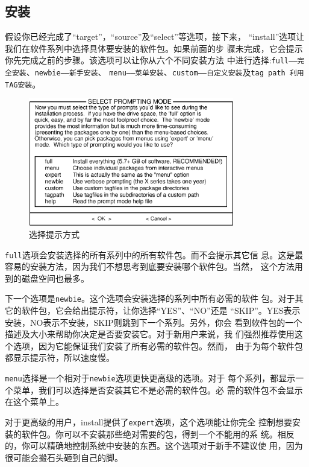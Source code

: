 \subsection{安装}
\label{sec:installation:setup:install}

假设你已经完成了``target''，``source''及``select''等选项，接下来，
``install''选项让我们在软件系列中选择具体要安装的软件包。如果前面的步
骤未完成，它会提示你先完成之前的步骤。该选项可以让你从六个不同安装方法
中进行选择:\texttt{full——完全安装}、\texttt{newbie——新手安装}、
\texttt{menu——菜单安装}、\texttt{custom——自定义安装}及\texttt{tag path
  利用TAG安装}。
\begin{figure}[htpb]
  \centering
  \includegraphics[width=0.8\textwidth]{images/installation/setup-install.eps}
  \caption{选择提示方式}
  \label{fig:selectPromptingMode}
\end{figure}

\texttt{full}选项会安装选择的所有系列中的所有软件包。而不会提示其它信
息。这是最容易的安装方法，因为我们不想思考到底要安装哪个软件包。当然，
这个方法用到的磁盘空间也最多。

下一个选项是\texttt{newbie}。这个选项会安装选择的系列中所有必需的软件
包。对于其它的软件包，它会给出提示符，让你选择``YES''、``NO''还是
``SKIP''。YES表示安装，NO表示不安装，SKIP则跳到下一个系列。另外，你会
看到软件包的一个描述及大小来帮助你决定是否要安装它。对于新用户来说，我
们强烈推荐使用这个选项，因为它能保证我们安装了所有必需的软件包。然而，
由于为每个软件包都显示提示符，所以速度慢。

\texttt{menu}选择是一个相对于\texttt{newbie}选项更快更高级的选项。对于
每个系列，都显示一个菜单，我们可以选择是否安装其它不是必需的软件包。必
需的软件包不会显示在这个菜单上。

对于更高级的用户，install提供了\texttt{expert}选项，这个选项能让你完全
控制想要安装的软件包。你可以不安装那些绝对需要的包，得到一个不能用的系
统。相反的，你可以精确地控制系统中安装的东西。这个选项对于新手不建议使
用，因为很可能会搬石头砸到自己的脚。

